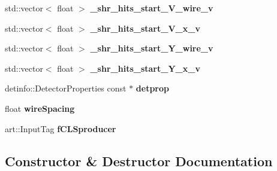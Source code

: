 \begin{DoxyCompactItemize}
\item 
std\+::vector$<$ float $>$ {\bfseries \+\_\+shr\+\_\+hits\+\_\+start\+\_\+\+V\+\_\+wire\+\_\+v}\hypertarget{classanalysis_1_1ShowerStartPoint_a8da89ea1e56775ed825d3c3a58ab29ba}{}\label{classanalysis_1_1ShowerStartPoint_a8da89ea1e56775ed825d3c3a58ab29ba}

\item 
std\+::vector$<$ float $>$ {\bfseries \+\_\+shr\+\_\+hits\+\_\+start\+\_\+\+V\+\_\+x\+\_\+v}\hypertarget{classanalysis_1_1ShowerStartPoint_a25a4ceefcd20c0a9268b8d5295409661}{}\label{classanalysis_1_1ShowerStartPoint_a25a4ceefcd20c0a9268b8d5295409661}

\item 
std\+::vector$<$ float $>$ {\bfseries \+\_\+shr\+\_\+hits\+\_\+start\+\_\+\+Y\+\_\+wire\+\_\+v}\hypertarget{classanalysis_1_1ShowerStartPoint_a9e08a10e12183c9fcfde9d37cc705e11}{}\label{classanalysis_1_1ShowerStartPoint_a9e08a10e12183c9fcfde9d37cc705e11}

\item 
std\+::vector$<$ float $>$ {\bfseries \+\_\+shr\+\_\+hits\+\_\+start\+\_\+\+Y\+\_\+x\+\_\+v}\hypertarget{classanalysis_1_1ShowerStartPoint_a0877a78dd2b3824ebdd2f6ed642b8ed1}{}\label{classanalysis_1_1ShowerStartPoint_a0877a78dd2b3824ebdd2f6ed642b8ed1}

\item 
detinfo\+::\+Detector\+Properties const $\ast$ {\bfseries detprop}\hypertarget{classanalysis_1_1ShowerStartPoint_ab5406ce8acaaad17d9eca9657d75ea01}{}\label{classanalysis_1_1ShowerStartPoint_ab5406ce8acaaad17d9eca9657d75ea01}

\item 
float {\bfseries wire\+Spacing}\hypertarget{classanalysis_1_1ShowerStartPoint_a91f95c2987d8b4912373ae1b6d76328e}{}\label{classanalysis_1_1ShowerStartPoint_a91f95c2987d8b4912373ae1b6d76328e}

\item 
art\+::\+Input\+Tag {\bfseries f\+C\+L\+Sproducer}\hypertarget{classanalysis_1_1ShowerStartPoint_ab4453ba8d9a5ee4f35226c8c6ef7becd}{}\label{classanalysis_1_1ShowerStartPoint_ab4453ba8d9a5ee4f35226c8c6ef7becd}

\end{DoxyCompactItemize}


\subsection{Constructor \& Destructor Documentation}
